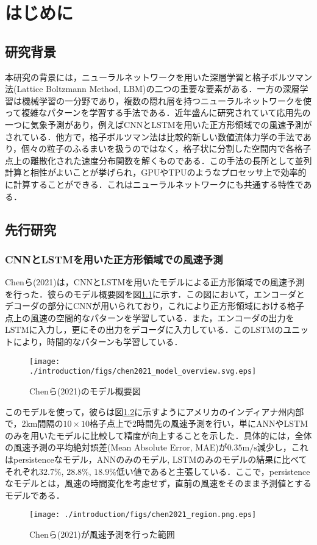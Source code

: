 \chapter{はじめに}

\section{研究背景}
本研究の背景には，ニューラルネットワークを用いた深層学習と格子ボルツマン法(Lattice Boltzmann Method, LBM)の二つの重要な要素がある．一方の深層学習は機械学習の一分野であり，複数の隠れ層を持つニューラルネットワークを使って複雑なパターンを学習する手法である．近年盛んに研究されていて応用先の一つに気象予測があり\cite{Schultz2021}，例えばCNNとLSTMを用いた正方形領域での風速予測がされている\cite{CHEN2021114451}．他方で，格子ボルツマン法は比較的新しい数値流体力学の手法であり，個々の粒子のふるまいを扱うのではなく，格子状に分割した空間内で各格子点上の離散化された速度分布関数を解くものである\cite{doi:10.1146/annurev.fluid.30.1.329}．この手法の長所として並列計算と相性がよいことが挙げられ，GPUやTPUのようなプロセッサ上で効率的に計算することができる\cite{Satofuka1999}．これはニューラルネットワークにも共通する特性である．

\section{先行研究}
\subsection{CNNとLSTMを用いた正方形領域での風速予測 \label{subsec:chen2021}}
Chenら(2021)は，CNNとLSTMを用いたモデルによる正方形領域での風速予測を行った\cite{CHEN2021114451}．彼らのモデル概要図を図\ref{fig:chen2021_architecture}に示す．この図において，エンコーダとデコーダの部分にCNNが用いられており，これにより正方形領域における格子点上の風速の空間的なパターンを学習している．また，エンコーダの出力をLSTMに入力し，更にその出力をデコーダに入力している．このLSTMのユニットにより，時間的なパターンも学習している．
\begin{figure}[tbp]
    \centering
    \texttt{[image: ./introduction/figs/chen2021\_model\_overview.svg.eps]}
    \caption{Chenら(2021)のモデル概要図\cite{CHEN2021114451}}
    \label{fig:chen2021_architecture}
\end{figure}

このモデルを使って，彼らは図\ref{fig:chen2021_region}に示すようにアメリカのインディアナ州内部で，2km間隔の$10 \times 10$格子点上で2時間先の風速予測を行い，単にANNやLSTMのみを用いたモデルに比較して精度が向上することを示した．具体的には，全体の風速予測の平均絶対誤差(Mean Absolute Error, MAE)が$0.35 \mathrm{m/s}$減少し，これはpersistenceなモデル，ANNのみのモデル, LSTMのみのモデルの結果に比べてそれぞれ$32.7\%$, $28.8\%$, $18.9\%$低い値であると主張している．ここで，persistenceなモデルとは，風速の時間変化を考慮せず，直前の風速をそのまま予測値とするモデルである．
\begin{figure}[tbp]
    \centering
    \texttt{[image: ./introduction/figs/chen2021\_region.png.eps]}
    \caption{Chenら(2021)が風速予測を行った範囲\cite{CHEN2021114451}}
    \label{fig:chen2021_region}
\end{figure}


